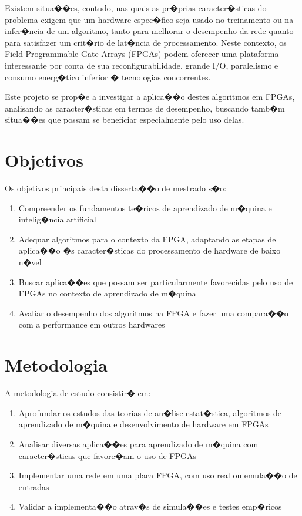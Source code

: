 \documentclass[a4paper,11pt,oneside]{article}
\begin{document}
        Existem situa��es, contudo, nas quais as pr�prias caracter�sticas do
        problema exigem que um hardware espec�fico seja usado no treinamento ou
        na infer�ncia de um algoritmo, tanto para melhorar o desempenho da rede
        quanto para satisfazer um crit�rio de lat�ncia de processamento. Neste
        contexto, os Field Programmable Gate Arrays (FPGAs) podem oferecer uma
        plataforma interessante por conta de sua reconfigurabilidade, grande
        I/O, paralelismo e consumo energ�tico inferior � tecnologias
        concorrentes.

        Este projeto se prop�e a investigar a aplica��o destes algoritmos em
        FPGAs, analisando as caracter�sticas em termos de desempenho, buscando
        tamb�m situa��es que possam se beneficiar especialmente pelo uso delas.

        \section{Objetivos}
	\vspace{-1cm}
	\noindent\hrulefill

        	Os objetivos principais desta disserta��o de mestrado s�o:
	\begin{enumerate}
        \item Compreender os fundamentos te�ricos de aprendizado
          de m�quina e intelig�ncia artificial
        \item Adequar algoritmos para o contexto da FPGA, adaptando as etapas de
          aplica��o �s caracter�sticas do processamento de hardware de baixo
          n�vel
        \item Buscar aplica��es que possam ser particularmente favorecidas pelo
          uso de FPGAs no contexto de aprendizado de m�quina
        \item Avaliar o desempenho dos algoritmos na FPGA e fazer uma compara��o
          com a performance em outros hardwares
	\end{enumerate}

	\section{Metodologia}
	\vspace{-1cm}
	\noindent\hrulefill

	A metodologia de estudo consistir� em:
	\begin{enumerate}
        \item Aprofundar os estudos das teorias de an�lise estat�stica,
          algoritmos de aprendizado de m�quina e desenvolvimento de hardware em
          FPGAs
        \item Analisar diversas aplica��es para aprendizado de m�quina com
          caracter�sticas que favore�am o uso de FPGAs
        \item Implementar uma rede em uma placa FPGA, com uso real ou emula��o
          de entradas
        \item Validar a implementa��o atrav�s de simula��es e testes emp�ricos
	\end{enumerate}
\end{document}
